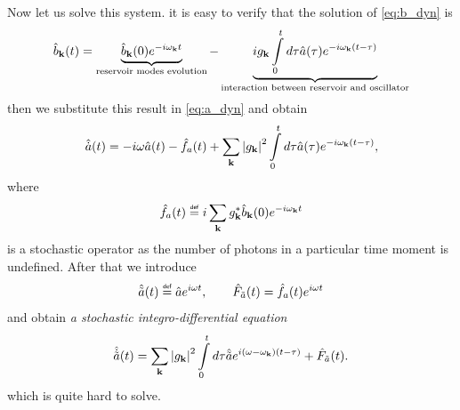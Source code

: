 Now let us solve this system. it is easy to verify that the solution of  \eqref{eq:b_dyn}  is
\begin{equation}
	\hat{b}_{\mathbf{k}}(t) = \underbrace{\hat{b}_{\mathbf{k}}(0) e^{-i\omega_{\mathbf{k}} t}}_{\text{reservoir modes evolution}} - \underbrace{i g_{\mathbf{k}} \int \limits_0^{t} d\tau \hat{a}(\tau) e^{-i\omega_{\mathbf{k}}(t - \tau)}}_{\text{interaction between reservoir and oscillator}}
\end{equation}
then we substitute this result in \eqref{eq:a_dyn} and obtain
\begin{equation}
	\hat{\dot{a}}(t) = - i \omega \hat{a}(t) - \hat{f}_a(t) + \sum_{\mathbf{k}} \left| g_{\mathbf{k}} \right|^2 \int \limits_0^td\tau \hat{a}(\tau) e^{-i\omega_{\mathbf{k}}(t - \tau)},
\end{equation}
where
\begin{equation}
	\hat{f}_a(t) \myeq i \sum_{\kv} g_{\kv}^* \hat{b}_{\kv}(0) e^{-i\omega_{\kv} t}
\end{equation}
is a stochastic operator as the number of photons in a particular time moment is undefined. After that we introduce 
\begin{equation}
	\hat{\tilde{a}}(t) \myeq \hat{a} e^{i \omega t}, \qquad \hat{F}_{\tilde{a}} (t) = \hat{f}_a(t) e^{i \omega t}
\end{equation}
and obtain \textit{a stochastic integro-differential equation} 
\begin{equation}
	\hat{\dot{\tilde{a}}}(t) = \sum_{\mathbf{k}} \left| g_{\mathbf{k}} \right|^2 \int \limits_0^t d\tau \hat{\tilde{a}} e^{i(\omega-\omega_{\mathbf{k}})(t - \tau)} + \hat{F}_{\tilde{a}} (t).
	\label{eq:st_int_dif}
\end{equation}
which is quite hard to solve.

